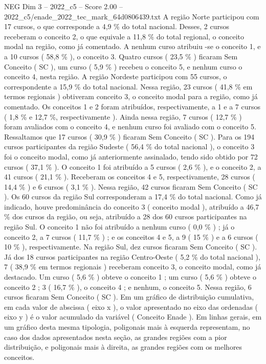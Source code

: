 \begin{textsample}{NEG Dim 3 – 2022\_c5 – Score 2.00 – 2022\_c5/enade\_2022\_tec\_mark\_64d0806439.txt}
A região Norte participou com 17 cursos, o que corresponde a 4,9 \% do total nacional.
Desses, 2 cursos receberam o conceito 2, o que equivale a 11,8 \% do total regional, o conceito modal na região, como já comentado.
A nenhum curso atribuiu -se o conceito 1, e a 10 cursos ( 58,8 \% ), o conceito 3.
Quatro cursos ( 23,5 \% ) ficaram Sem Conceito ( SC ), um curso ( 5,9 \% ) recebeu o conceito 5, e nenhum curso o conceito 4, nesta região.
A região Nordeste participou com 55 cursos, o correspondente a 15,9 \% do total nacional.
Nessa região, 23 cursos ( 41,8 \% em termos regionais ) obtiveram conceito 3, o conceito modal para a região, como já comentado.
Os conceitos 1 e 2 foram atribuídos, respectivamente, a 1 e a 7 cursos ( 1,8 \% e 12,7 \%, respectivamente ).
Ainda nessa região, 7 cursos ( 12,7 \% ) foram avaliados com o conceito 4, e nenhum curso foi avaliado com o conceito 5.
Ressaltamos que 17 cursos ( 30,9 \% ) ficaram Sem Conceito ( SC ).
Para os 194 cursos participantes da região Sudeste ( 56,4 \% do total nacional ), o conceito 3 foi o conceito modal, como já anteriormente assinalado, tendo sido obtido por 72 cursos ( 37,1 \% ).
O conceito 1 foi atribuído a 5 cursos ( 2,6 \% ), e o conceito 2, a 41 cursos ( 21,1 \% ).
Receberam os conceitos 4 e 5, respectivamente, 28 cursos ( 14,4 \% ) e 6 cursos ( 3,1 \% ).
Nessa região, 42 cursos ficaram Sem Conceito ( SC ).
Os 60 cursos da região Sul corresponderam a 17,4 \% do total nacional.
Como já indicado, houve predominância do conceito 3 ( conceito modal ), atribuído a 46,7 \% dos cursos da região, ou seja, atribuído a 28 dos 60 cursos participantes na região Sul.
O conceito 1 não foi atribuído a nenhum curso ( 0,0 \% ) ; já o conceito 2, a 7 cursos ( 11,7 \% ) ; e os conceitos 4 e 5, a 9 ( 15 \% ) e a 6 cursos ( 10 \% ), respectivamente.
Na região Sul, dez cursos ficaram Sem Conceito ( SC ).
Já dos 18 cursos participantes na região Centro-Oeste ( 5,2 \% do total nacional ), 7 ( 38,9 \% em termos regionais ) receberam conceito 3, o conceito modal, como já destacado.
Um curso ( 5,6 \% ) obteve o conceito 1 ; um curso ( 5,6 \% ) obteve o conceito 2 ; 3 ( 16,7 \% ), o conceito 4 ; e nenhum, o conceito 5.
Nessa região, 6 cursos ficaram Sem Conceito ( SC ).
Em um gráfico de distribuição cumulativa, em cada valor de abscissa ( eixo x ), o valor apresentado no eixo das ordenadas ( eixo y ) é o valor acumulado da variável ( Conceito Enade ).
Em linhas gerais, em um gráfico desta mesma tipologia, poligonais mais à esquerda representam, no caso dos dados apresentados nesta seção, as grandes regiões com a pior distribuição, e poligonais mais à direita, as grandes regiões com os melhores conceitos.

\end{textsample}
